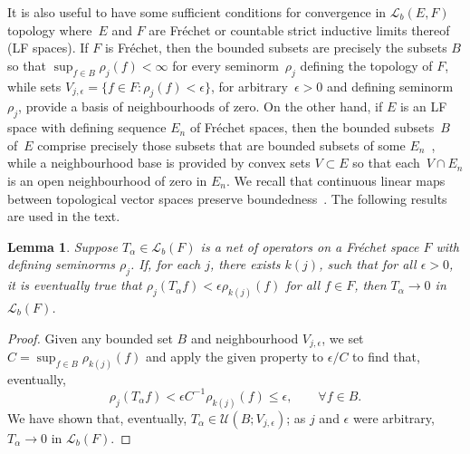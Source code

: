 \documentclass[pdftex]{sigma}
\numberwithin{equation}{section}
\newtheorem{Lemma}[Theorem]{Lemma}
\newcommand{\LL}{{\mathcal L}}
\newcommand{\Uf}{{\mathscr U}}
\begin{document}
 It is also useful to have some sufficient conditions for convergence in $\LL_b(E,F)$ topology where~$E$ and $F$ are Fr\'echet or countable strict inductive limits thereof (LF spaces). If $F$ is Fr\'echet, then the bounded subsets are precisely the subsets $B$ so that $\sup_{f\in B} \rho_j(f)<\infty$ for every seminorm~$\rho_j$ defining the topology of $F$, while sets $V_{j,\epsilon}=\{f\in F\colon\rho_j(f)<\epsilon\}$, for arbitrary~$\epsilon>0$ and defining seminorm $\rho_j$, provide a basis of neighbourhoods of zero. On the other hand, if $E$ is an LF space with defining sequence $E_n$ of Fr\'echet spaces, then
 the bounded subsets~$B$ of~$E$ comprise precisely those subsets that are bounded subsets of some $E_n$~\cite[Proposition~14.6]{Treves:TVS}, while a neighbourhood base is provided by convex sets $V\subset E$ so that
 each~$V\cap E_n$ is an open neighbourhood of zero in $E_n$.
 We recall that continuous linear maps between topological vector spaces preserve boundedness~\cite[Proposition~14.2]{Treves:TVS}. The following results are used in the text.
 \begin{Lemma} \label{lem:LbFrechet}
 	Suppose $T_\alpha\in \LL_b(F)$ is a net of operators on a Fr\'echet space $F$ with defining seminorms $\rho_j$. If, for each $j$, there exists $k(j)$,
 	such that for all $\epsilon>0$, it is eventually true that $\rho_j(T_\alpha f)<\epsilon\rho_{k(j)}(f)$ for all $f\in F$, then $T_\alpha\to 0$ in $\LL_b(F)$.
 \end{Lemma}
 \begin{proof}
 	Given any bounded set $B$ and
 	neighbourhood $V_{j,\epsilon}$, we set $C=\sup_{f\in B}\rho_{k(j)}(f)$ and apply the given property to $\epsilon/C$ to find that, eventually,{\samepage
 	\begin{equation*}
 		\rho_j(T_\alpha f)<\epsilon C^{-1} \rho_{k(j)}(f) \le \epsilon, \qquad \forall f\in B.
 	\end{equation*}
 	We have shown that, eventually, $T_\alpha\in \Uf(B;V_{j,\epsilon})$; as $j$ and $\epsilon$ were arbitrary, $T_\alpha\to 0$ in $\LL_b(F)$.}
 \end{proof}
\end{document}
